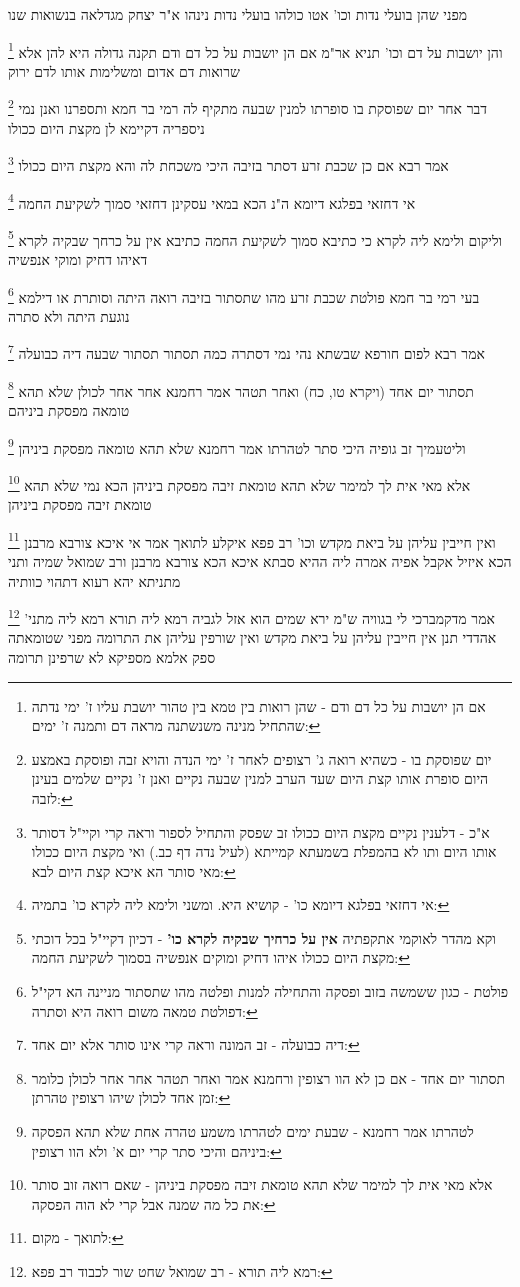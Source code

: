 \documentclass[12pt, openany]{book}
\newcommand{\footnotecomment}[1]{
	\renewcommand\thefootnote{}
	\footnote{#1}}
\newcommand{\commenta}[1]{\footnotecomment{#1}}
\begin{document}
{מפני שהן בועלי נדות וכו' אטו כולהו בועלי נדות נינהו א"ר יצחק מגדלאה בנשואות שנו
\commenta{אם הן יושבות על כל דם ודם - שהן רואות בין טמא בין טהור יושבת עליו ז' ימי נדתה שהתחיל מנינה משנשתנה מראה דם ותמנה ז' ימים:}
והן יושבות על דם וכו' תניא אר"מ אם הן יושבות על כל דם ודם תקנה גדולה היא להן
אלא שרואות דם אדום ומשלימות אותו לדם ירוק 
\commenta{יום שפוסקת בו - כשהיא רואה ג' רצופים לאחר ז' ימי הנדה והויא זבה ופוסקת באמצע היום סופרת אותו קצת היום שעד הערב למנין שבעה נקיים ואנן ז' נקיים שלמים בעינן לזבה:}
דבר אחר יום שפוסקת בו סופרתו למנין שבעה 
מתקיף לה רמי בר חמא ותספרנו ואנן נמי ניספריה דקיימא לן מקצת היום ככולו 
\commenta{א"כ - דלענין נקיים מקצת היום ככולו זב שפסק והתחיל לספור וראה קרי וקיי"ל דסותר אותו היום ותו לא בהמפלת בשמעתא קמייתא (לעיל נדה דף כב.) ואי מקצת היום ככולו מאי סותר הא איכא קצת היום לבא:}
אמר רבא אם כן שכבת זרע דסתר בזיבה היכי משכחת לה והא מקצת היום ככולו 
\commenta{אי דחזאי בפלגא דיומא כו' - קושיא היא. ומשני ולימא ליה לקרא כו' בתמיה:}
אי דחזאי בפלגא דיומא ה"נ הכא במאי עסקינן דחזאי סמוך לשקיעת החמה 
\commenta{וקא מהדר לאוקמי אתקפתיה \textbf{אין על כרחיך שבקיה לקרא כו'} - דכיון דקיי"ל בכל דוכתי מקצת היום ככולו איהו דחיק ומוקים אנפשיה בסמוך לשקיעת החמה:}
וליקום ולימא ליה לקרא כי כתיבא סמוך לשקיעת החמה כתיבא אין על כרחך שבקיה לקרא דאיהו דחיק ומוקי אנפשיה 
\commenta{פולטת - כגון ששמשה בזוב ופסקה והתחילה למנות ופלטה מהו שתסתור מניינה הא דקי"ל דפולטת טמאה משום רואה היא וסתרה:}
בעי רמי בר חמא פולטת שכבת זרע מהו שתסתור בזיבה רואה היתה וסותרת
או דילמא נוגעת היתה ולא סתרה 
\commenta{דיה כבועלה - זב המונה וראה קרי אינו סותר אלא יום אחד:}
אמר רבא לפום חורפא שבשתא נהי נמי דסתרה כמה תסתור תסתור שבעה דיה כבועלה 
\commenta{תסתור יום אחד - אם כן לא הוו רצופין ורחמנא אמר ואחר תטהר אחר אחר לכולן כלומר זמן אחד לכולן שיהו רצופין טהרתן:}
תסתור יום אחד (ויקרא טו, כח) ואחר תטהר אמר רחמנא אחר אחר לכולן שלא תהא טומאה מפסקת ביניהם 
\commenta{לטהרתו אמר רחמנא - שבעת ימים לטהרתו משמע טהרה אחת שלא תהא הפסקה ביניהם והיכי סתר קרי יום א' ולא הוו רצופין:}
וליטעמיך זב גופיה היכי סתר לטהרתו אמר רחמנא שלא תהא טומאה מפסקת ביניהן 
\commenta{אלא מאי אית לך למימר שלא תהא טומאת זיבה מפסקת ביניהן - שאם רואה זוב סותר את כל מה שמנה אבל קרי לא הוה הפסקה:}
אלא מאי אית לך למימר שלא תהא טומאת זיבה מפסקת ביניהן הכא נמי שלא תהא טומאת זיבה מפסקת ביניהן
\commenta{לתואך - מקום:}
ואין חייבין עליהן על ביאת מקדש וכו' רב פפא איקלע לתואך אמר אי איכא צורבא מרבנן הכא איזיל אקבל אפיה אמרה ליה ההיא סבתא איכא הכא צורבא מרבנן ורב שמואל שמיה ותני מתניתא יהא רעוא דתהוי כוותיה 
\commenta{רמא ליה תורא - רב שמואל שחט שור לכבוד רב פפא:}
אמר מדקמברכי לי בגוויה ש"מ ירא שמים הוא אזל לגביה רמא ליה תורא רמא ליה מתני' אהדדי תנן אין חייבין עליהן על ביאת מקדש ואין שורפין עליהן את התרומה מפני שטומאתה ספק אלמא מספיקא לא שרפינן תרומה
}
\end{document}
